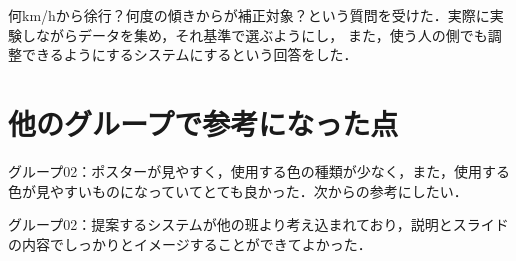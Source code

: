 \documentclass[uplatex]{jsarticle}
\begin{document}
何km/hから徐行？何度の傾きからが補正対象？という質問を受けた．実際に実験しながらデータを集め，それ基準で選ぶようにし，
また，使う人の側でも調整できるようにするシステムにするという回答をした．





\section{他のグループで参考になった点}
グループ02：ポスターが見やすく，使用する色の種類が少なく，また，使用する色が見やすいものになっていてとても良かった．次からの参考にしたい．

グループ02：提案するシステムが他の班より考え込まれており，説明とスライドの内容でしっかりとイメージすることができてよかった．
\end{document}
